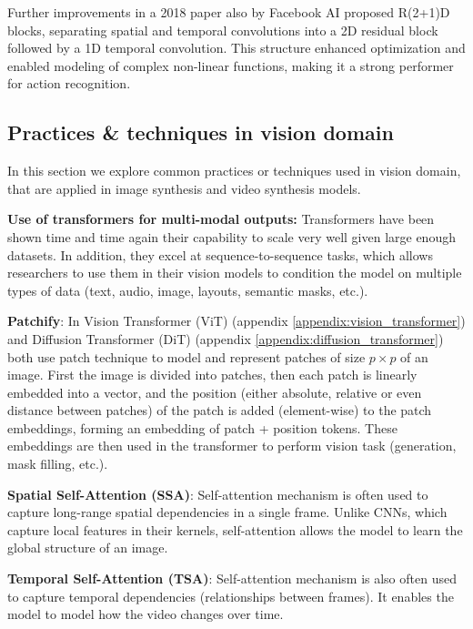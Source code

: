 Further improvements in a 2018 paper \cite{tran2018closer} also by Facebook AI proposed R(2+1)D blocks, separating spatial and temporal convolutions into a 2D residual block followed by a 1D temporal convolution. This structure enhanced optimization and enabled modeling of complex non-linear functions, making it a strong performer for action recognition.














\subsection{Practices \& techniques in vision domain}

In this section we explore common practices or techniques used in vision domain, that are applied in image synthesis and video synthesis models.

\textbf{Use of transformers for multi-modal outputs:} Transformers have been shown time and time again their capability to scale very well given large enough datasets. In addition, they excel at sequence-to-sequence tasks, which allows researchers to use them in their vision models to condition the model on multiple types of data (text, audio, image, layouts, semantic masks, etc.).

\textbf{Patchify}: In Vision Transformer (ViT) \cite{vision_transformer} (appendix \ref{appendix:vision_transformer}) and Diffusion Transformer (DiT) \cite{diffusion_transformer} (appendix \ref{appendix:diffusion_transformer}) both use patch technique to model and represent patches of size $p \times p$ of an image. First the image is divided into patches, then each patch is linearly embedded into a vector, and the position (either absolute, relative or even distance between patches) of the patch is added (element-wise) to the patch embeddings, forming an embedding of patch + position tokens. These embeddings are then used in the transformer to perform vision task (generation, mask filling, etc.).

\textbf{Spatial Self-Attention (SSA)}: Self-attention mechanism is often used to capture long-range spatial dependencies in a single frame. Unlike CNNs, which capture local features in their kernels, self-attention allows the model to learn the global structure of an image.

\textbf{Temporal Self-Attention (TSA)}: Self-attention mechanism is also often used to capture temporal dependencies (relationships between frames). It enables the model to model how the video changes over time.

